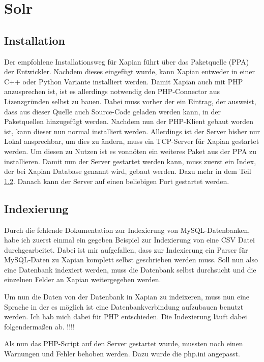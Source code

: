 
\section{Solr}

\subsection{Installation}

Der empfohlene Installationsweg für Xapian führt über das Paketquelle (PPA) der Entwickler. Nachdem dieses eingefügt wurde, kann Xapian entweder in einer C++ oder Python Variante installiert werden. Damit Xapian auch mit PHP anzusprechen ist, ist es allerdings notwendig den PHP-Connector aus Lizenzgründen selbst zu bauen. Dabei muss vorher der ein Eintrag, der ausweist, dass aus dieser Quelle auch Source-Code geladen werden kann, in der Paketquellen hinzugefügt werden. Nachdem nun der PHP-Klient gebaut worden ist, kann dieser nun normal installiert werden.
Allerdings ist der Server bisher nur Lokal ansprechbar, um dies zu ändern, muss ein TCP-Server für Xapian gestartet werden. Um diesen zu Nutzen ist es vonnöten ein weiteres Paket aus der PPA zu installieren. Damit nun der Server gestartet werden kann, muss zuerst ein Index, der bei Xapian Database genannt wird, gebaut werden. Dazu mehr in dem Teil \ref{xap:index}. Danach kann der Server auf einen beliebigen Port gestartet werden.

\subsection{Indexierung}
\label{xap:index}

Durch die fehlende Dokumentation zur Indexierung von MySQL-Datenbanken, habe ich zuerst einmal ein gegeben Beispiel zur Indexierung von eine CSV Datei durchgearbeitet. Dabei ist mir aufgefallen, dass zur Indexierung ein Parser für MySQL-Daten zu Xapian komplett selbst geschrieben werden muss. Soll nun also eine Datenbank indexiert werden, muss die Datenbank selbst durchsucht und die einzelnen Felder an Xapian weitergegeben werden.  

Um nun die Daten von der Datenbank in Xapian zu indeixeren, muss nun eine Sprache in der es möglich ist eine Datenbankverbindung aufzubauen benutzt werden. Ich hab mich dabei für PHP entschieden. Die Indexierung läuft dabei folgendermaßen ab. !!!!

Als nun das PHP-Script auf den Server gestartet wurde, mussten noch einen Warnungen und Fehler behoben werden. Dazu wurde die php.ini angepasst. 

